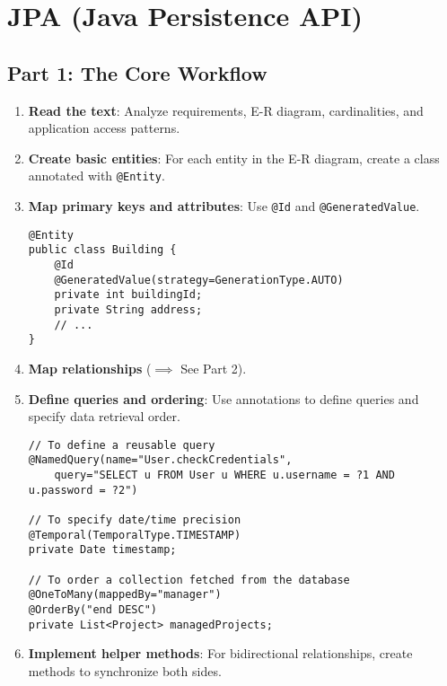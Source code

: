 
\section*{JPA (Java Persistence API)}

\subsection*{Part 1: The Core Workflow}
\begin{enumerate}
    \item \textbf{Read the text}: Analyze requirements, E-R diagram, cardinalities, and application access patterns.
    \item \textbf{Create basic entities}: For each entity in the E-R diagram, create a class annotated with \texttt{@Entity}.
    \item \textbf{Map primary keys and attributes}: Use \texttt{@Id} and \texttt{@GeneratedValue}.
    \begin{lstlisting}
@Entity
public class Building {
    @Id 
    @GeneratedValue(strategy=GenerationType.AUTO)
    private int buildingId;
    private String address;
    // ...
}
    \end{lstlisting}
    \item \textbf{Map relationships} ($\implies$ See Part 2).
    \item \textbf{Define queries and ordering}: Use annotations to define queries and specify data retrieval order.
    \begin{lstlisting}
// To define a reusable query
@NamedQuery(name="User.checkCredentials", 
    query="SELECT u FROM User u WHERE u.username = ?1 AND u.password = ?2")

// To specify date/time precision
@Temporal(TemporalType.TIMESTAMP)
private Date timestamp;

// To order a collection fetched from the database
@OneToMany(mappedBy="manager")
@OrderBy("end DESC")
private List<Project> managedProjects;
    \end{lstlisting}
    \item \textbf{Implement helper methods}: For bidirectional relationships, create methods to synchronize both sides.
\end{enumerate}

